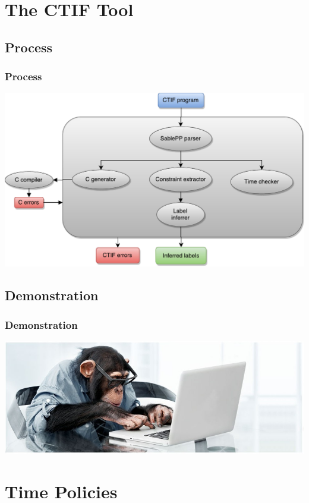 \documentclass[10pt]{beamer}
\begin{document}
\section{The CTIF Tool}

\subsection{Process}
\begin{frame}
  \frametitle{Process}
  \includegraphics[width=\textwidth]{figures/thetool.pdf}
\end{frame}

\subsection{Demonstration}
\begin{frame}
  \frametitle{Demonstration}
  \centering

  \includegraphics[width=\textwidth]{figures/codemonkey}
\end{frame}

\section{Time Policies}
\end{document}
